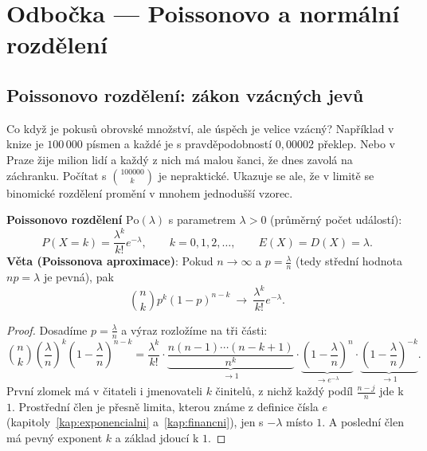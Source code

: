 \section{Odbočka --- Poissonovo a normální rozdělení}

\subsection{Poissonovo rozdělení: zákon vzácných jevů}

Co když je pokusů obrovské množství, ale úspěch je velice vzácný? Například v knize je $100\,000$ písmen a každé je s pravděpodobností $0{,}00002$ překlep. Nebo v Praze žije milion lidí a každý z nich má malou šanci, že dnes zavolá na záchranku. Počítat s $\binom{100000}{k}$ je nepraktické. Ukazuje se ale, že v limitě se binomické rozdělení promění v mnohem jednodušší vzorec.

\begin{definitionbox}
  \textbf{Poissonovo rozdělení} $\mathrm{Po}(\lambda)$ s parametrem $\lambda > 0$ (průměrný počet událostí):
  \begin{equation*}
    P(X = k) = \frac{\lambda^k}{k!}e^{-\lambda},\qquad k = 0, 1, 2, \ldots,\qquad E(X) = D(X) = \lambda.
  \end{equation*}
  \textbf{Věta (Poissonova aproximace)}: Pokud $n\to\infty$ a $p = \frac{\lambda}{n}$ (tedy střední hodnota $np = \lambda$ je pevná), pak
  \begin{equation*}
    \binom{n}{k}p^k{(1 - p)}^{n - k}\ \longrightarrow\ \frac{\lambda^k}{k!}e^{-\lambda}.
  \end{equation*}
\end{definitionbox}

\begin{proof}
  Dosadíme $p = \frac{\lambda}{n}$ a výraz rozložíme na tři části:
  \begin{equation*}
    \binom{n}{k}{\left(\frac{\lambda}{n}\right)}^k{\left(1 - \frac{\lambda}{n}\right)}^{n - k} = \frac{\lambda^k}{k!}\cdot\underbrace{\frac{n(n - 1)\cdots(n - k + 1)}{n^k}}_{\to 1}\cdot\underbrace{{\left(1 - \frac{\lambda}{n}\right)}^n}_{\to e^{-\lambda}}\cdot\underbrace{{\left(1 - \frac{\lambda}{n}\right)}^{-k}}_{\to 1}.
  \end{equation*}
  První zlomek má v čitateli i jmenovateli $k$ činitelů, z nichž každý podíl $\frac{n - j}{n}$ jde k $1$. Prostřední člen je přesně limita, kterou známe z definice čísla $e$ (kapitoly~\ref{kap:exponencialni} a~\ref{kap:financni}), jen s $-\lambda$ místo $1$. A poslední člen má pevný exponent $k$ a základ jdoucí k $1$.
\end{proof}

